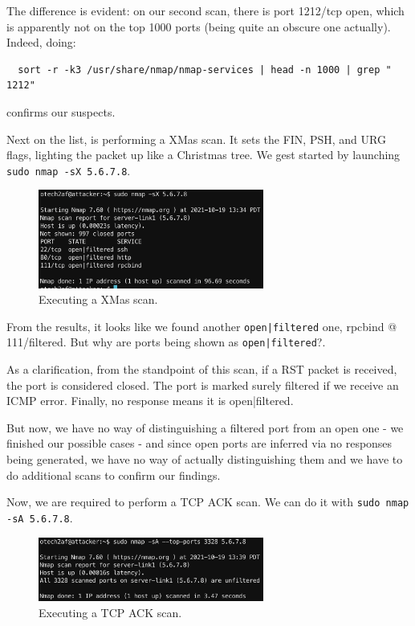 \documentclass[a4paper,11pt,hidelinks]{article}
\begin{document}
The difference is evident: on our second scan, there is port 1212/tcp open, which is apparently not on the top 1000 ports (being quite an obscure one actually). Indeed, doing:

\begin{verbatim}
  sort -r -k3 /usr/share/nmap/nmap-services | head -n 1000 | grep " 1212"
\end{verbatim}

confirms our suspects.

Next on the list, is performing a XMas scan. It sets the FIN, PSH, and URG flags, lighting the packet up like a Christmas tree. We gest started by launching \verb=sudo nmap -sX 5.6.7.8=.

\begin{figure}[h!]
  \centering
  \includegraphics[width=0.66\textwidth]{../drawable/enumeration-xmas.png}
  \caption{Executing a XMas scan.}
\end{figure}

From the results, it looks like we found another \verb=open|filtered= one, rpcbind @ 111/filtered. But why are ports being shown as \verb=open|filtered=?.

As a clarification, from the standpoint of this scan, if a RST packet is received, the port is considered closed. The port is marked surely filtered if we receive an ICMP error. Finally, no response means it is open|filtered.

But now, we have no way of distinguishing a filtered port from an open one - we finished our possible cases - and since open ports are inferred via no responses being generated, we have no way of actually distinguishing them and we have to do additional scans to confirm our findings.

Now, we are required to perform a TCP ACK scan. We can do it with \verb=sudo nmap -sA 5.6.7.8=.

\begin{figure}[h!]
  \centering
  \includegraphics[width=0.66\textwidth]{../drawable/enumeration-ack.png}
  \caption{Executing a TCP ACK scan.}
\end{figure}
\end{document}
